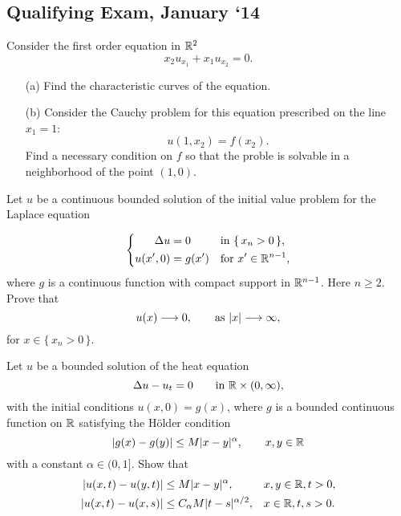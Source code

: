 \subsection{Qualifying Exam, January `14}
\begin{problem}
  Consider the first order equation in \(\mathbb{R}^2\)
  \[
    x_2u_{x_1}+x_1u_{x_2}=0.
  \]
  \begin{itemize}[noitemsep]
  \item[(a)] Find the characteristic curves of the equation.
  \item[(b)] Consider the Cauchy problem for this equation prescribed on
    the line \(x_1=1\):
    \[
      u(1,x_2)=f(x_2).
    \]
    Find a necessary condition on \(f\) so that the proble is solvable in a
    neighborhood of the point \((1,0)\).
  \end{itemize}
\end{problem}
\begin{solution*}
\end{solution*}

\begin{problem}
  Let \(u\) be a continuous bounded solution of the initial value problem
  for the Laplace equation

  \[
    \left\{
      \begin{aligned}
        \Delta u&=0&&\text{in \(\{\,x_n>0\,\}\),}\\
        u(x',0)&=g(x')&&\text{for \(x'\in\mathbb{R}^{n-1}\),}
      \end{aligned}
    \right.
  \]
  where \(g\) is a continuous function with compact support in
  \(\mathbb{R}^{n-1}\). Here \(n\geq 2\). Prove that
  \[
    u(x)\To 0,\qquad%
    \text{as } |x|\To \infty,
  \]
  for \(x\in\{\,x_n>0\,\}\).
\end{problem}
\begin{solution*}
\end{solution*}

\begin{problem}
  Let \(u\) be a bounded solution of the heat equation
  \[
    \Delta u-u_t=0\qquad\text{in \(\mathbb{R}\times(0,\infty)\),}
  \]
  with the initial conditions \(u(x,0)=g(x)\), where \(g\) is a bounded
  continuous function on \(\mathbb{R}\) satisfying the Hölder condition
  \[
    |g(x)-g(y)|\leq M|x-y|^\alpha,\qquad x,y\in\mathbb{R}
  \]
  with a constant \(\alpha\in (0, 1]\). Show that
  \[
    \begin{aligned}
      |u(x,t)-u(y,t)|&\leq M|x-y|^\alpha,&&x,y\in\mathbb{R},t>0,\\
      |u(x,t)-u(x,s)|&\leq C_\alpha M|t-s|^{\alpha/2},&&x\in\mathbb{R},t,s>0.
    \end{aligned}
  \]

  \noindent [\emph{Hint:} For the last inequality, in the representation
  formula of \(u(x,t)\) as a convolution with the heat kernel
  \(\Phi(y,t)\), make a change of variables \(z=y/\sqrt{t}\) and use that
  $\left|\sqrt{t}-\sqrt{s}\right|\leq\sqrt{|t-s|}$.]
\end{problem}
\begin{solution*}
\end{solution*}

